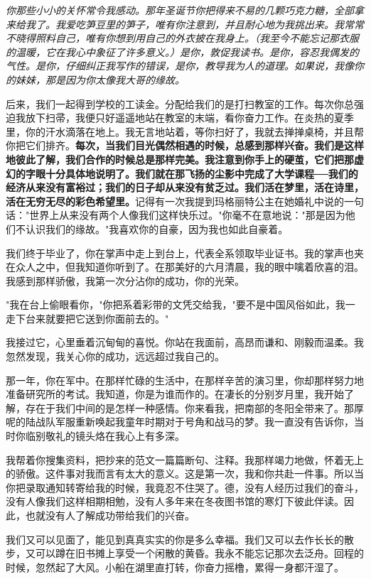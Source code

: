 \documentclass[UTF8,a4paper,8pt]{ctexbook}
\begin{document}
		\textit{你那些小小的关怀常令我感动。那年圣诞节你把得来不易的几颗巧克力糖，全部拿来给我了。我爱吃笋豆里的笋子，唯有你注意到，并且耐心地为我挑出来。我常常不晓得照料自己，唯有你想到用自己的外衣披在我身上。（我至今不能忘记那衣服的温暖，它在我心中象征了许多意义。）是你，敦促我读书。是你，容忍我偶发的气性。是你，仔细纠正我写作的错误，是你，教导我为人的道理。如果说，我像你的妹妹，那是因为你太像我大哥的缘故。}
		
		后来，我们一起得到学校的工读金。分配给我们的是打扫教室的工作。每次你总强迫我放下扫帚，我便只好遥遥地站在教室的末端，看你奋力工作。在炎热的夏季里，你的汗水滴落在地上。我无言地站着，等你扫好了，我就去掸掸桌椅，并且帮你把它们排齐。\textbf{每次，当我们目光偶然相遇的时候，总感到那样兴奋。我们是这样地彼此了解，我们合作的时候总是那样完美。我注意到你手上的硬茧，它们把那虚幻的字眼十分具体地说明了。我们就在那飞扬的尘影中完成了大学课程──我们的经济从来没有富裕过；我们的日子却从来没有贫乏过。我们活在梦里，活在诗里，活在无穷无尽的彩色希望里。}记得有一次我提到玛格丽特公主在她婚礼中说的一句话："世界上从来没有两个人像我们这样快乐过。"你毫不在意地说："那是因为他们不认识我们的缘故。"我喜欢你的自豪，因为我也如此自豪着。
		
		我们终于毕业了，你在掌声中走上到台上，代表全系领取毕业证书。我的掌声也夹在众人之中，但我知道你听到了。在那美好的六月清晨，我的眼中噙着欣喜的泪。我感到那样骄傲，我第一次分沾你的成功，你的光荣。
		
		"我在台上偷眼看你，"你把系着彩带的文凭交给我，"要不是中国风俗如此，我一走下台来就要把它送到你面前去的。"
		
		我接过它，心里垂着沉甸甸的喜悦。你站在我面前，高昂而谦和、刚毅而温柔。我忽然发现，我关心你的成功，远远超过我自己的。
		
		那一年，你在军中。在那样忙碌的生活中，在那样辛苦的演习里，你却那样努力地准备研究所的考试。我知道，你是为谁而作的。在凄长的分别岁月里，我开始了解，存在于我们中间的是怎样一种感情。你来看我，把南部的冬阳全带来了。那厚呢的陆战队军服重新唤起我童年时期对于号角和战马的梦。我一直没有告诉你，当时你临别敬礼的镜头烙在我心上有多深。
		
		我帮着你搜集资料，把抄来的范文一篇篇断句、注释。我那样竭力地做，怀着无上的骄傲。这件事对我而言有太大的意义。这是第一次，我和你共赴一件事。所以当你把录取通知转寄给我的时候，我竟忍不住哭了。德，没有人经历过我们的奋斗，没有人像我们这样相期相勉，没有人多年来在冬夜图书馆的寒灯下彼此伴读。因此，也就没有人了解成功带给我们的兴奋。
		
		我们又可以见面了，能见到真真实实的你是多么幸福。我们又可以去作长长的散步，又可以蹲在旧书摊上享受一个闲散的黄昏。我永不能忘记那次去泛舟。回程的时候，忽然起了大风。小船在湖里直打转，你奋力摇橹，累得一身都汗湿了。
		
\end{document}
